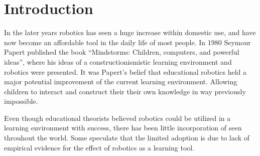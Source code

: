 \section*{Introduction}
In the later years robotics has seen a huge increase within domestic use, and have now become an affordable tool in the daily life of most people.
In 1980 Seymour Papert published the book "`Mindstorms: Children, computers, and powerful ideas"'\cite{papert1980mindstorms}, where his ideas of a constructionismistic 
learning environment and robotics were presented. It was Papert's belief that educational robotics held a major potential improvement of the current learning environment.
Allowing children to interact and construct their their own knowledge in way previously impossible. 

\bigskip\noindent
Even though educational theorists believed robotics could be utilized in a learning environment with success, there has been little
incorporation of seen throuhout the world. 
Some speculate that the limited adoption is due to lack of empirical evidence for the effect of robotics as a learning tool\cite{williams2007acquisition}.  